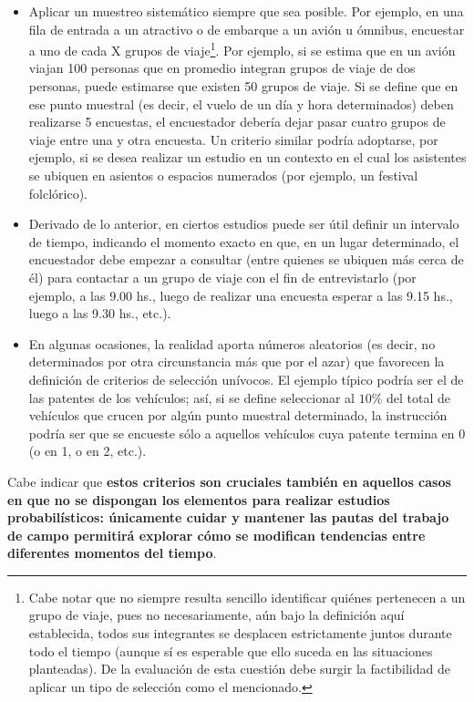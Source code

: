\documentclass[
]{book}
\begin{document}
\begin{itemize}
\item
  Aplicar un muestreo sistemático siempre que sea posible. Por ejemplo, en una fila de entrada a un atractivo o de embarque a un avión u ómnibus, encuestar a uno de cada X grupos de viaje\footnote{Cabe notar que no siempre resulta sencillo identificar quiénes pertenecen a un grupo de viaje, pues no necesariamente, aún bajo la definición aquí establecida, todos sus integrantes se desplacen estrictamente juntos durante todo el tiempo (aunque sí es esperable que ello suceda en las situaciones planteadas). De la evaluación de esta cuestión debe surgir la factibilidad de aplicar un tipo de selección como el mencionado.}. Por ejemplo, si se estima que en un avión viajan 100 personas que en promedio integran grupos de viaje de dos personas, puede estimarse que existen 50 grupos de viaje. Si se define que en ese punto muestral (es decir, el vuelo de un día y hora determinados) deben realizarse 5 encuestas, el encuestador debería dejar pasar cuatro grupos de viaje entre una y otra encuesta. Un criterio similar podría adoptarse, por ejemplo, si se desea realizar un estudio en un contexto en el cual los asistentes se ubiquen en asientos o espacios numerados (por ejemplo, un festival folclórico).
\item
  Derivado de lo anterior, en ciertos estudios puede ser útil definir un intervalo de tiempo, indicando el momento exacto en que, en un lugar determinado, el encuestador debe empezar a consultar (entre quienes se ubiquen más cerca de él) para contactar a un grupo de viaje con el fin de entrevistarlo (por ejemplo, a las 9.00 hs., luego de realizar una encuesta esperar a las 9.15 hs., luego a las 9.30 hs., etc.).
\item
  En algunas ocasiones, la realidad aporta números aleatorios (es decir, no determinados por otra circunstancia más que por el azar) que favorecen la definición de criterios de selección unívocos. El ejemplo típico podría ser el de las patentes de los vehículos; así, si se define seleccionar al \(10\%\) del total de vehículos que crucen por algún punto muestral determinado, la instrucción podría ser que se encueste sólo a aquellos vehículos cuya patente termina en 0 (o en 1, o en 2, etc.).\\
\end{itemize}

Cabe indicar que \textbf{estos criterios son cruciales también en aquellos casos en que no se dispongan los elementos para realizar estudios probabilísticos: únicamente cuidar y mantener las pautas del trabajo de campo permitirá explorar cómo se modifican tendencias entre diferentes momentos del tiempo}.
\end{document}
